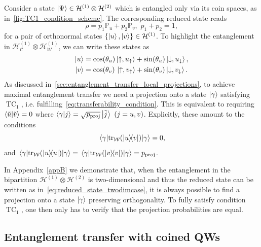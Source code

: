 \documentclass[
	aps, pra,
	superscriptaddress, twocolumn,
	floatfix,
	10pt
]{revtex4-1}
\newcommand{\on}[1]{\operatorname{#1}}
\newcommand{\parTitle}[1]{\noindent{\color{Mahogany}(\emph{#1})}}
\newcommand{\PP}{\mathbb{P}}
\newcommand{\calC}{{\mathcal{C}}}
\newcommand{\calH}{{\mathcal{H}}}
\newcommand{\calW}{{\mathcal{W}}}
\newcommand{\HC}{\calH_\calC}
\newcommand{\HW}{\calH_\calW}
\newcommand{\commale}[1]{{\textcolor{red} {\it{[Note (Ale): #1]}}}}
\renewcommand{\parTitle}[1]{}
\begin{document}
\parTitle{Problem setting}
Consider a state $\ket\Psi\in\calH^{(1)}\otimes\calH^{(2)}$ which is entangled only via its coin spaces, as in~\cref{fig:TC1_condition_scheme}. The corresponding reduced state %
reads
\begin{equation}
	\rho= p_1 \PP_u + p_2 \PP_v, \,\,p_1+p_2=1,
	\label{eq:reduced_state_twodimcase}
\end{equation}
for a pair of orthonormal states $\{\ket u,\ket v\}\in\calH^{(1)}$.
To highlight the entanglement in $\HC^{(1)}\otimes\HW^{(1)}$, we can write these states as
\begin{equation}
\begin{aligned}
    \ket u &=
    \cos(\theta_u) \ket{\uparrow, u_\uparrow} +
    \sin(\theta_u) \ket{\downarrow, u_\downarrow}, \\
    \ket v &=
    \cos(\theta_v) \,\ket{\uparrow, v_\uparrow} +
    \sin(\theta_v) \ket{\downarrow, v_\downarrow}.
\end{aligned}
\end{equation}
As discussed in~\cref{sec:entanglement_transfer_local_projections}, to achieve maximal entanglement transfer we need a projection onto a state $\ket\gamma$ satisfying $\on{TC}_1$, i.e. fulfilling~\cref{eq:transferability_condition}.
This is equivalent to requiring $\braket{\tilde u}{\tilde v}=0$ where $\braket{\gamma}{j}=\sqrt{p_{\on{proj}}}\ket{\tilde j}~(j=u,v)$.
Explicitly, these amount to the conditions
\begin{equation}
	\mel{\gamma}{\tr_{\calW}(\ketbra{u}{v})}{\gamma} = 0,
\end{equation}
and
$\mel{\gamma}{\tr_{\calW}(\ketbra{u})}{\gamma} =
\mel{\gamma}{\tr_{\calW}(\ketbra{v})}{\gamma} = p_{\on{proj}}$.

In Appendix~\ref{appB} we demonstrate that, when the entanglement in the bipartition $\calH^{(1)}\otimes\calH^{(2)}$ is two-dimensional and thus the reduced state can be written as in~\cref{eq:reduced_state_twodimcase}, it is always possible to find a projection onto a state $\ket\gamma$ preserving orthogonality.
To fully satisfy condition $\on{TC}_1$, one then only has to verify that the projection probabilities are equal.

\subsection{Entanglement transfer with coined QWs}
\label{subsec:analytical_results_QWs}
\end{document}
